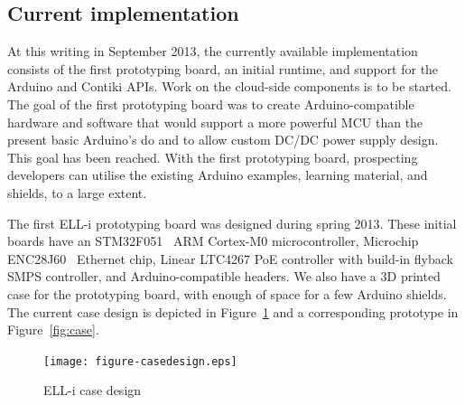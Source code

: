 \documentclass{siamltex}
\begin{document}
\subsection{Current implementation}

At this writing in September 2013, the currently available
implementation consists of the first prototyping board, an initial
runtime, and support for the Arduino and Contiki APIs.  Work on the cloud-side
components is to be started.
The goal of the first prototyping board was to create
Arduino-compatible hardware and software that would support a more
powerful
MCU than the present basic Arduino's do and to allow custom DC/DC
power supply design.  This goal has been reached.  With the first
prototyping board, prospecting developers can utilise the existing
Arduino examples, learning material, and shields, to a large extent.

The first ELL-i prototyping board was designed during spring 2013.  
These initial
boards have an STM32F051~\cite{STM32F051} ARM Cortex-M0
microcontroller, Microchip ENC28J60~\cite{ENC28J60} Ethernet chip,
Linear LTC4267 PoE controller with build-in flyback SMPS controller,
and Arduino-compatible headers.  We also have a 3D printed case for
the prototyping board, with enough of space for a few Arduino shields.
The current case design is depicted in Figure~\ref{fig:casedesign} and
a corresponding prototype in Figure~\ref{fig:case}.

\begin{figure}
\centering
\texttt{[image: figure-casedesign.eps]}
\caption{ELL-i case design}
\label{fig:casedesign}
\end{figure}


\end{document}
